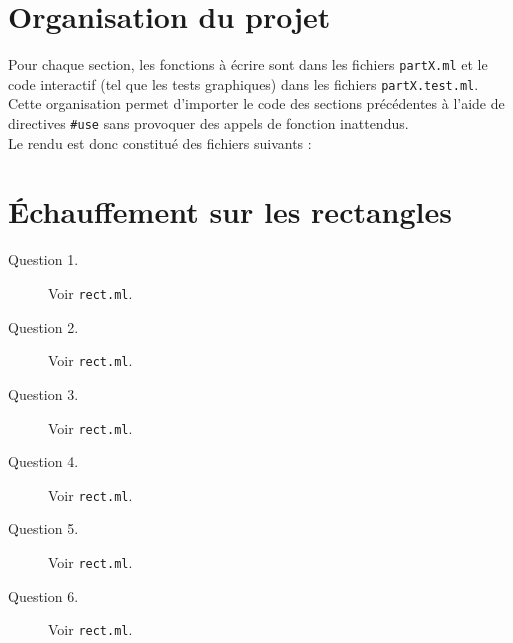 \documentclass[11pt]{scrartcl}
\newcommand{\filename}[1]{\texttt{\textcolor{darkbrown}{#1}}}
\begin{document}
\break

\section*{Organisation du projet}
Pour chaque section, les fonctions à écrire sont dans les fichiers \filename{partX.ml} et le code interactif (tel que les tests graphiques) dans les fichiers \filename{partX.test.ml}. Cette organisation permet d'importer le code des sections précédentes à l'aide de directives \texttt{#use} sans provoquer des appels de fonction inattendus.
\\
Le rendu est donc constitué des fichiers suivants :


\section{Échauffement sur les rectangles}

\begin{description}
\item[Question 1.] Voir \filename{rect.ml}.

\item[Question 2.] Voir \filename{rect.ml}.

\item[Question 3.] Voir \filename{rect.ml}.

\item[Question 4.] Voir \filename{rect.ml}.

\item[Question 5.] Voir \filename{rect.ml}.

\item[Question 6.] Voir \filename{rect.ml}.
\end{description}
\end{document}
